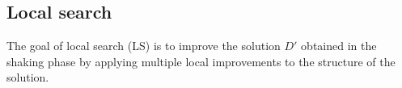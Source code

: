 \documentclass[dvipsnames,format=sigconf]{acmart} %
\begin{document}
\subsection{Local search}\label{sec:local_search}
The goal of local search (LS) is to improve the solution $D'$ obtained in the shaking phase by applying multiple local improvements to the structure of the solution. 

\begin{comment}
    The LS tailored to MkDP is described in Algorithm~\ref{alg:ls}.

  \begin{algorithm}[!t] 
  	\caption{\texttt{LocalSearch}}\label{alg:ls}
  	\begin{algorithmic}[1]
  		\STATE \textbf{Input}: a solution $D$
  		\STATE \textbf{Output}: a (possibly) improved solution $D_{best}$
  		\STATE $D_{best} \gets D$
  		\STATE $best_{fit} \gets fitness(D_{best})$
 		\\//\, first, achieve feasibility by adding vertices
 		\STATE improved $\gets$ True
  		\WHILE{\emph{improved}}
  		     \STATE $improved \gets  False$
  		     \STATE $best_{v} \gets$ None
  		     \FOR{$v \in V \setminus D_{best}$}
  		          \STATE $D' \gets D_{best} \cup \{v\}$
  		          \IF{$new_{fit} = fitness_{fast}(D') < best_{fit}$}
  		              \STATE $best_v \gets v$
  		              \STATE $best_{fit} \gets new_{fit}$
  		              \STATE $improved \gets True$
  		          \ENDIF
  		     \ENDFOR
  		     \IF{\emph{improved}}
  		         \STATE $D_{best} \gets D_{best} \cup \{best_v\}$
  		     \ENDIF

  		\ENDWHILE   	
  		\\ //\, second, remove vertices, but keep the feasibility	    
  		 \STATE  $improved \gets True$
  		 \WHILE{\emph{improved}}
  		   \STATE $improved \gets  False$
  		    \STATE $best_{v} \gets$ None
  		    \FOR{$v \in D_{best}$}
  		       \STATE $D' \gets D_{best} \setminus \{v\}$
  		        \IF{$new_{fit} = fitness_{fast}(D') < best_{fit}$}
  		             \STATE $best_v \gets v$
  		             \STATE $best_{fit} \gets new_{fit}$	              
  		             \STATE $improved \gets True$
  		       \ENDIF
  		        \IF{\emph{improved}}
  		      		 \STATE $D_{best} \gets D_{best} \setminus \{best_v\}$
  		       \ENDIF
  		       
  		    \ENDFOR
  		\ENDWHILE
  		\STATE return $D_{best}$
  	\end{algorithmic}
\end{algorithm}
\end{comment}
\end{document}
